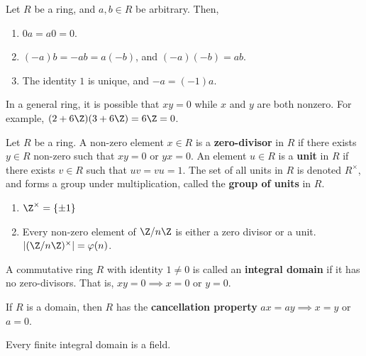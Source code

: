 \begin{prop}
    Let $R$ be a ring, and $a,b\in R$ be arbitrary. Then,
    \begin{enumerate}
        \item $0a =a0 = 0$.
        \item $(-a)b=-ab=a(-b)$, and $(-a)(-b)=ab$.
        \item The identity $1$ is unique, and $-a=(-1)a$.
    \end{enumerate}
\end{prop}

\begin{rmk}
    In a general ring, it is possible that $xy=0$ while $x$ and $y$ are both nonzero. For example, $(2+6\Z)(3+6\Z)=6\Z=0$.
\end{rmk}

\begin{defn}
    Let $R$ be a ring. A non-zero element $x \in R$ is a \textbf{zero-divisor} in $R$ if there exists $y \in R$ non-zero such that $xy=0$ or $yx=0$. An element $u \in R$ is a \textbf{unit} in $R$ if there exists $v\in R$ such that $uv=vu=1$. The set of all units in $R$ is denoted $R^\times$, and forms a group under multiplication, called the \textbf{group of units} in $R$.
\end{defn}

\begin{ex}
    \begin{enumerate}
        \item $\Z^\times = \{\pm 1\}$
        \item Every non-zero element of $\Z/n\Z$ is either a zero divisor or a unit. $|(\Z/n\Z)^\times|=\varphi(n)$.
    \end{enumerate}
\end{ex}
\begin{defn}
    A commutative ring $R$ with identity $1 \neq 0$ is called an \textbf{integral domain} if it has no zero-divisors. That is, $xy=0\implies x=0$ or $y=0$.
\end{defn}

\begin{prop}
    If $R$ is a domain, then $R$ has the \textbf{cancellation property} $ax=ay \implies x=y$ or $a=0$.
\end{prop}

\begin{cor}
    Every finite integral domain is a field.
\end{cor}

